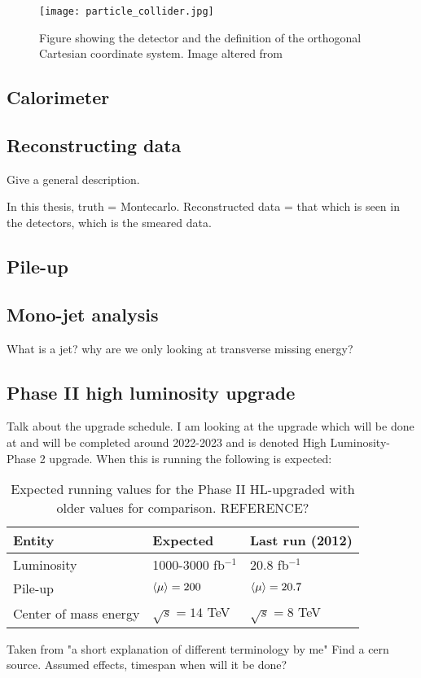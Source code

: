 \begin{figure}[ht]
\begin{center}
\texttt{[image: particle\_collider.jpg]}
\caption{Figure showing the \abbrATLAS detector and the definition of the orthogonal Cartesian coordinate system. Image altered from\citep{coordimage}}
\label{fig:coordinatesystem}
\end{center}
\end{figure}

\subsection{Calorimeter}
\subsection{Reconstructing data}
Give a general description.

In this thesis, truth = Montecarlo. 
Reconstructed data = that which is seen in the detectors, which is the smeared data.
\subsection{Pile-up}\label{sec:experiment:subsec:pileup}
\subsection{Mono-jet analysis}\label{sec:experiment:subsec:monojet}
What is a jet? why are we only looking at transverse missing energy? 

\subsection{Phase II high luminosity upgrade}
Talk about the upgrade schedule. \citep{ATLAS:LOI2}
I am looking at the upgrade which will be done at \abbrCERN and will be completed around 2022-2023 and is denoted High Luminosity-\abbrLHC Phase 2 upgrade. When this is running the following is expected:
\renewcommand{\arraystretch}{1.5} %
\begin{table}[H]
\begin{center}
    \begin{tabular}{ | l | l | l |}
    \hline
    Entity & Expected & Last run (2012) \\ \hline
  	Luminosity & 1000-3000 fb$^{-1}$ & 20.8 fb$^{-1}$ \\ \hline
  	Pile-up & $\left<\mu\right>=200$ & $\left<\mu\right>=20.7$ \\ \hline
  	Center of mass energy & $\sqrt{s}=14$ TeV &  $\sqrt{s}=8$ TeV \\ \hline
  	\end{tabular}
  	
  	\caption{Expected running values for the Phase II HL-upgraded \abbrLHC with older values for comparison. REFERENCE?}
  	\label{tab:expectvalues}
  	\end{center}
    \end{table}
    \renewcommand{\arraystretch}{1.0}  %
Taken from "a short explanation of different terminology by me" Find a cern source.
Assumed effects, timespan when will it be done?

